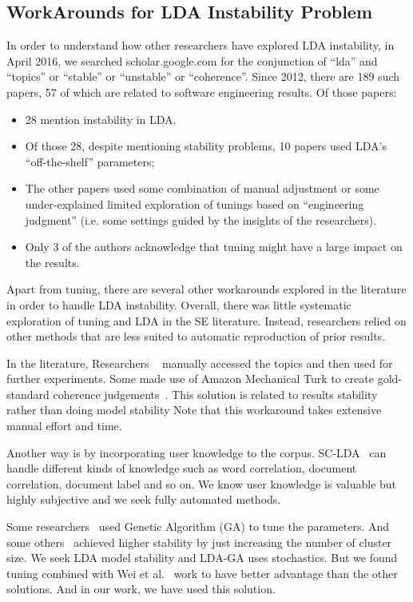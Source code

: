 \documentclass[10pt,conference]{IEEEtran}
\newcommand{\bi}{\begin{itemize}}
\newcommand{\ei}{\end{itemize}}
\theoremstyle{break}
\begin{document}
\subsection{WorkArounds for LDA Instability Problem}
\label{sect: solutions}
In order to understand how other researchers have explored LDA instability,
in April 2016, we searched scholar.google.com for the conjunction of “lda” and “topics” or “stable” or
“unstable” or “coherence”. Since 2012, there are  189 such papers, 57
of which are related to software engineering results. Of those papers:
\bi
\item 28
mention instability in LDA. %
\item Of those 28, despite mentioning stability problems,
  10 papers used LDA's ``off-the-shelf'' parameters;
  \item The  other papers used some combination of manual adjustment or some
under-explained limited exploration of tunings based on ``engineering judgment''
(i.e. some settings guided by the insights of the researchers).
\item
Only 3 of the authors acknowledge that tuning might have a large impact
on the results.
\ei
Apart from tuning, there are several other workarounds explored in the literature
in order to handle LDA instability. Overall, there was little systematic exploration of tuning and LDA in the SE literature.
Instead, researchers relied on other methods that are less suited to automatic reproduction of prior results.

In the literature, Researchers ~\cite{maskeri2008mining, martin2015app, guzman2014users}
    manually accessed the topics and then used for further experiments. Some
    made use of Amazon Mechanical Turk to create gold-standard coherence
    judgements~\cite{lau2014machine}. This solution is related to results
    stability rather than doing model stability
    Note that this workaround takes extensive manual effort and time.

Another way is by incorporating user knowledge to the corpus. SC-LDA~\cite{yang2015improving} can handle different kinds of knowledge such as word correlation, document correlation, document label and so on. We know user knowledge is valuable but highly subjective and we seek fully automated methods.

Some researchers~\cite{panichella2013effectively, lohar2013improving, sun2015msr4sm}
used Genetic Algorithm (GA) to tune the parameters. And some others~\cite{galvis2013analysis, tian2009using}
achieved higher stability by just increasing the number of cluster size.
We seek LDA model stability and LDA-GA uses stochastics. But we found tuning
  combined with Wei et al.~\cite{fu2016tuning} work to have better advantage
  than the other solutions. And in our work, we have used this solution.
 
\end{document}
